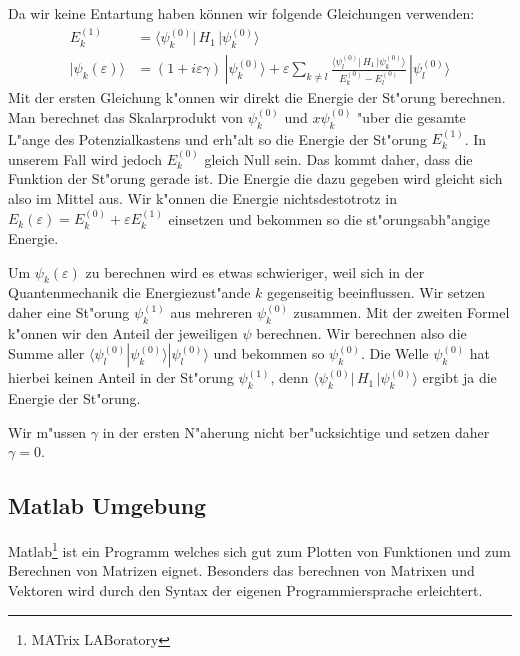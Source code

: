\begin{refsection}
Da wir keine Entartung haben k\"onnen wir folgende Gleichungen verwenden:
\begin{equation}
\begin{aligned}
E_k^{(1)} &=
\langle \psi_k^{(0)}|\, H_1 \,|\psi_k^{(0)}\rangle
\\
|\psi_k(\varepsilon)\rangle &=
(1+i\varepsilon \gamma)
\,|\psi_k^{(0)}\rangle
+
\varepsilon
\sum_{k\ne l}
\frac{\langle \psi_l^{(0)}|\, H_1 \,|\psi_k^{(0)}\rangle}{E_k^{(0)}-E_l^{(0)}}
\,
|\psi_l^{(0)}\rangle
\label{eq:efeld_ESkalarprodukt}
\end{aligned}
\end{equation}
Mit der ersten Gleichung k"onnen wir direkt die Energie der St"orung berechnen.
Man berechnet das Skalarprodukt von $\psi_k^{(0)}$ und $x \psi_k^{(0)}$ "uber 
die gesamte L"ange des Potenzialkastens und erh"alt so die Energie der St"orung $E_k^{(1)}$.
In unserem Fall wird jedoch $E_k^{(0)}$ gleich Null sein.
Das kommt daher, dass die Funktion der St"orung gerade ist.
Die Energie die dazu gegeben wird gleicht sich also im Mittel aus.
Wir k"onnen die Energie nichtsdestotrotz in $E_k(\varepsilon)=E_k^{(0)} + \varepsilon E_k^{(1)}$ einsetzen
und bekommen so die st"orungsabh"angige Energie.

Um $\psi_k(\varepsilon)$ zu berechnen wird es etwas schwieriger, weil sich in der Quantenmechanik die Energiezust"ande $k$ gegenseitig beeinflussen.
Wir setzen daher eine St"orung $\psi_k^{(1)}$ aus mehreren $\psi_k^{(0)}$ zusammen.
Mit der zweiten Formel k"onnen wir den Anteil der jeweiligen $\psi$ berechnen.
Wir berechnen also die Summe aller $\langle\psi_l^{(0)}|\psi_k^{(0)}\rangle|\psi_l^{(0)}\rangle$
und bekommen so $\psi_k^{(0)}$.
Die Welle $\psi_k^{(0)}$ hat hierbei keinen Anteil in der St"orung $\psi_k^{(1)}$,
denn $\langle \psi_k^{(0)}|\, H_1 \,|\psi_k^{(0)}\rangle$ ergibt ja die Energie der St"orung.

Wir m"ussen $\gamma$ in der ersten N"aherung nicht ber"ucksichtige und setzen daher $\gamma = 0$.




\subsection{Matlab Umgebung}

Matlab\footnote{MATrix LABoratory} ist ein Programm welches sich gut zum Plotten von Funktionen
und zum Berechnen von Matrizen eignet.
Besonders das berechnen von Matrixen und Vektoren wird durch den Syntax der eigenen Programmiersprache erleichtert.


\end{refsection}
